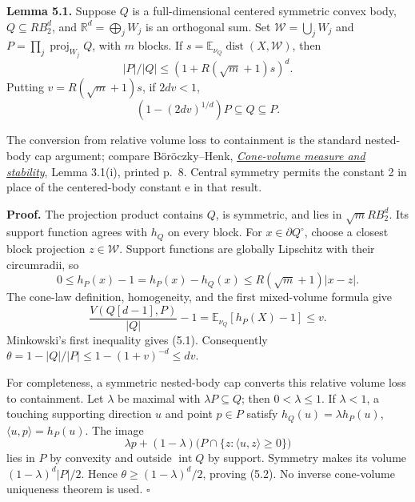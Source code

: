\documentclass[
  11pt,
]{article}
\begin{document}
\textbf{Lemma 5.1.} Suppose \(Q\) is a full-dimensional centered
symmetric convex body, \(Q\subseteq R B_2^d\), and
\(\mathbb R^d=\bigoplus_jW_j\) is an orthogonal sum. Set
\(\mathcal W=\bigcup_jW_j\) and \(P=\prod_j\operatorname{proj}_{W_j}Q\),
with \(m\) blocks. If
\(s=\mathbb E_{\nu_Q}\operatorname{dist}(X,\mathcal W)\), then \[
 |P|/|Q|\le(1+R(\sqrt m+1)s)^d.                               \tag{5.1}
\] Putting \(v=R(\sqrt m+1)s\), if \(2dv<1\), \[
 (1-(2dv)^{1/d})P\subseteq Q\subseteq P.                       \tag{5.2}
\]

The conversion from relative volume loss to containment is the standard
nested-body cap argument; compare Böröczky--Henk,
\href{https://www.renyi.hu/~carlos/cone-volume-stability.pdf}{\emph{Cone-volume
measure and stability}}, Lemma 3.1(i), printed p.~8. Central symmetry
permits the constant 2 in place of the centered-body constant e in that
result.

\textbf{Proof.} The projection product contains \(Q\), is symmetric, and
lies in \(\sqrt m R B_2^d\). Its support function agrees with \(h_Q\) on
every block. For \(x\in\partial Q^\circ\), choose a closest block
projection \(z\in\mathcal W\). Support functions are globally Lipschitz
with their circumradii, so \[
 0\le h_P(x)-1=h_P(x)-h_Q(x)
 \le R(\sqrt m+1)|x-z|.
\] The cone-law definition, homogeneity, and the first mixed-volume
formula give \[
 \frac{V(Q[d-1],P)}{|Q|}-1
 =\mathbb E_{\nu_Q}[h_P(X)-1]\le v.
\] Minkowski's first inequality gives (5.1). Consequently
\(\theta=1-|Q|/|P|\le1-(1+v)^{-d}\le dv\).

For completeness, a symmetric nested-body cap converts this relative
volume loss to containment. Let \(\lambda\) be maximal with
\(\lambda P\subseteq Q\); then \(0<\lambda\le1\). If \(\lambda<1\), a
touching supporting direction \(u\) and point \(p\in P\) satisfy
\(h_Q(u)=\lambda h_P(u)\), \(\langle u,p\rangle=h_P(u)\). The image \[
 \lambda p+(1-\lambda)\bigl(P\cap\{z:\langle u,z\rangle\ge0\}\bigr)
\] lies in \(P\) by convexity and outside \(\operatorname{int}Q\) by
support. Symmetry makes its volume \((1-\lambda)^d|P|/2\). Hence
\(\theta\ge(1-\lambda)^d/2\), proving (5.2). No inverse cone-volume
uniqueness theorem is used. \(\square\)
\end{document}
